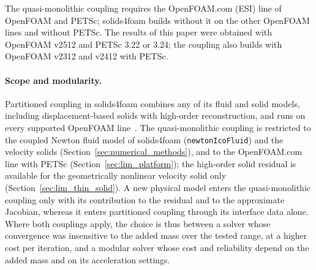 The quasi-monolithic coupling requires the OpenFOAM.com (ESI) line of OpenFOAM and PETSc; solids4foam builds without it on the other OpenFOAM lines and without PETSc.
The results of this paper were obtained with OpenFOAM v2512 and PETSc 3.22 or 3.24; the coupling also builds with OpenFOAM v2312 and v2412 with PETSc.

\paragraph{Scope and modularity.}
Partitioned coupling in solids4foam combines any of its fluid and solid models, including displacement-based solids with high-order reconstruction, and runs on every supported OpenFOAM line~\citep{Tukovic2018, Cardiff2025}.
The quasi-monolithic coupling is restricted to the coupled Newton fluid model of solids4foam (\texttt{newtonIcoFluid}) and the velocity solids (Section~\ref{sec:numerical_methods}), and to the OpenFOAM.com line with PETSc (Section~\ref{sec:lim_platform}); the high-order solid residual is available for the geometrically nonlinear velocity solid only (Section~\ref{sec:lim_thin_solid}).
A new physical model enters the quasi-monolithic coupling only with its contribution to the residual and to the approximate Jacobian, whereas it enters partitioned coupling through its interface data alone.
Where both couplings apply, the choice is thus between a solver whose convergence was insensitive to the added mass over the tested range, at a higher cost per iteration, and a modular solver whose cost and reliability depend on the added mass and on its acceleration settings.
